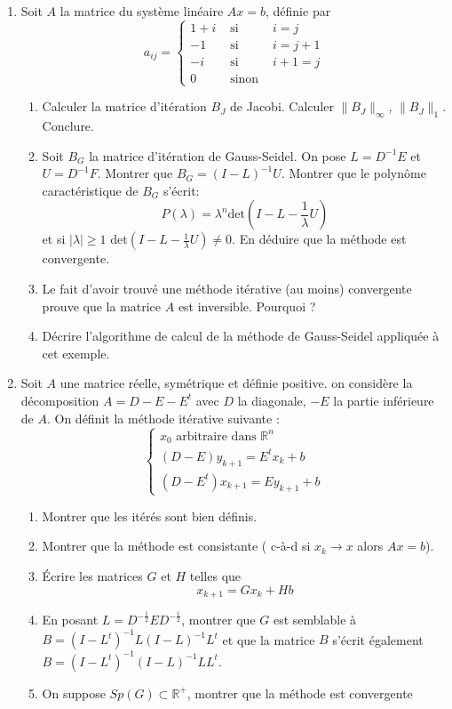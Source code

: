 \documentclass[a4paper]{article}
\begin{document}
\begin{enumerate}
\item Soit $A$ la matrice du système linéaire $Ax = b$, définie par
\[a_{ij}=\left\{\begin{array}{lll}
1+i & \mbox{ si } & i=j\\
-1 & \mbox{ si } & i=j+1\\
-i & \mbox{ si } & i+1=j\\
0 & \mbox{ sinon } & 
\end{array}\right.
\]
\begin{enumerate}
\item Calculer la matrice d'itération $B_J$ de Jacobi. Calculer $\|B_J\|_\infty$, $\|B_J\|_1$. Conclure.
\item Soit $B_G$ la matrice d'itération de Gauss-Seidel. On pose $L=D^{-1}E$ et $U=D^{-1}F$. Montrer que $B_G=(I-L)^{-1}U$. Montrer que le polynôme caractéristique de $B_G$ s'écrit:
\[P(\lambda)=\lambda^n \mbox{det}\left(I-L-\frac 1\lambda U\right)\]
et si $|\lambda|\geq 1$ $\mbox{det}\left(I-L-\frac 1\lambda U\right)\neq 0$. En déduire que la méthode est convergente.
\item Le fait d'avoir trouvé une méthode itérative (au moins) convergente prouve que la matrice $A$ est inversible. Pourquoi ?
\item Décrire l'algorithme de calcul de la méthode de Gauss-Seidel appliquée à cet exemple.
\end{enumerate}
\item Soit $A$ une matrice réelle, symétrique et définie positive. on considère la décomposition $A = D-E -E^t$ avec $D$ la diagonale, $-E$ la partie
inférieure de $A$. On définit la méthode itérative suivante :
\[\left\{\begin{array}{l}
x_0 \mbox{ arbitraire dans }\mathbb{R}^n\\
(D-E)y_{k+1} = E^t x_k + b\\
(D-E^t)x_{k+1} = E y_{k+1} + b
\end{array}\right.
\]



\begin{enumerate}
\item Montrer que les itérés sont bien définis.
\item Montrer que la méthode est consistante ( c-à-d si $x_k\to x$ alors $Ax = b$).
\item Écrire les matrices $G$ et $H$ telles que
\[ x_{k+1} = G x_k + Hb\]
\item En posant $L = D^{-\frac 12}E D^{-\frac 12}$, montrer que $G$ est semblable à $B = (I-L^t)^{-1}L(I-L)^{-1}L^t$ et que la matrice $B$ s'écrit également $B = (I-L^t)^{-1}(I-L)^{-1}L L^t$.
\item On suppose $Sp(G) \subset \mathbb{R}^+$, montrer que la méthode est convergente
\end{enumerate}

\end{enumerate}
\end{document}

